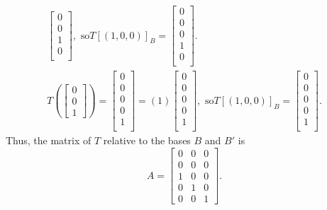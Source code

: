 \documentclass[a4paper,12pt]{article}
\begin{document}
\begin{align*}
\begin{bmatrix}
        0\\
        0\\
        1\\
        0\\
    \end{bmatrix},\text{ so} T[(1,0,0)]_B= \begin{bmatrix}
        0\\
        0\\
        0\\
        1\\
        0\\
    \end{bmatrix}.\\
    T\left(
        \begin{bmatrix}
            0\\
            0\\
            1
        \end{bmatrix}
    \right) = \begin{bmatrix}
        0\\
        0\\
        0\\
        0\\
        1\\
    \end{bmatrix} = (1) \begin{bmatrix}
        0\\
        0\\
        0\\
        0\\
        1\\
    \end{bmatrix},\text{ so} T[(1,0,0)]_B= \begin{bmatrix}
        0\\
        0\\
        0\\
        0\\
        1\\
    \end{bmatrix}.
\end{align*}
Thus, the matrix of $T$ relative to the bases $B$ and $B'$ is 
\[A=\begin{bmatrix}
    0&0&0\\
    0&0&0\\
    1&0&0\\
    0&1&0\\
    0&0&1
\end{bmatrix}.\]
\end{document}
